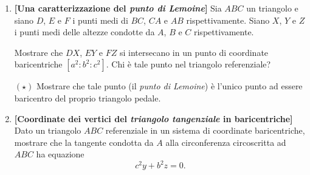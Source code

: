 \begin{enumerate}
	\item \textbf{[Una caratterizzazione del \textit{punto di Lemoine}]} Sia $ABC$ un triangolo e siano $D$, $E$ e $F$ i punti medi di $BC$, $CA$ e $AB$ rispettivamente. Siano $X$, $Y$ e $Z$ i punti medi delle altezze condotte da $A$, $B$ e $C$ rispettivamente. 
	
	Mostrare che $DX$, $EY$ e $FZ$ si intersecano in un punto di coordinate baricentriche $[a^2:b^2:c^2]$. Chi è tale punto nel triangolo referenziale?
	
	$(\star)$ Mostrare che tale punto (il \textit{punto di Lemoine}) è l'unico punto ad essere baricentro del proprio triangolo pedale.
	\item \textbf{[Coordinate dei vertici del \textit{triangolo tangenziale} in baricentriche]}  Dato un triangolo $ABC$ referenziale in un sistema di coordinate baricentriche, mostrare che la tangente condotta da $A$ alla circonferenza circoscritta ad $ABC$ ha equazione
	\begin{equation}
	c^2y+b^2z=0.
	\end{equation}
	

\end{enumerate}
